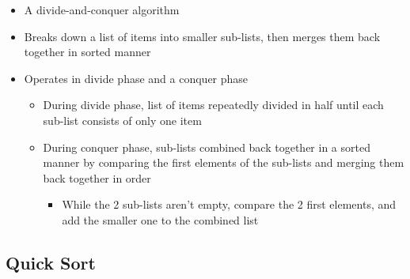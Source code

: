 \documentclass{article}
\begin{document}
\begin{itemize}
    \item A divide-and-conquer algorithm
    \item Breaks down a list of items into smaller sub-lists, then merges them back together in sorted manner
    \item Operates in divide phase and a conquer phase
    \begin{itemize}
        \item During divide phase, list of items repeatedly divided in half until each sub-list consists of only one item
        \item During conquer phase, sub-lists combined back together in a sorted manner by comparing the first elements of the sub-lists and merging them back together in order
        \begin{itemize}
            \item While the 2 sub-lists aren't empty, compare the 2 first elements, and add the smaller one to the combined list
        \end{itemize}
    \end{itemize}
\end{itemize}

\subsection{Quick Sort}
\end{document}
